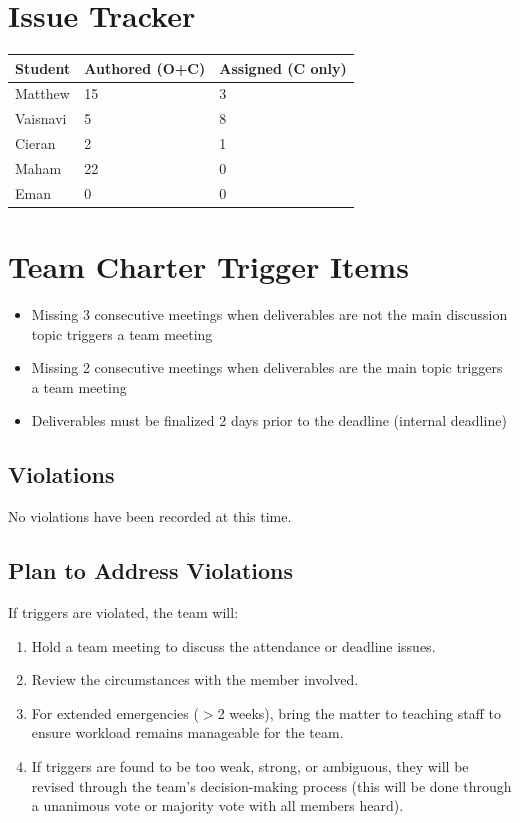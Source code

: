 \documentclass{article}
\begin{document}
\section{Issue Tracker}

\begin{table}[H]
\centering
\begin{tabular}{lll}
\toprule
\textbf{Student} & \textbf{Authored (O+C)} & \textbf{Assigned (C only)}\\
\midrule
Matthew & 15 & 3 \\
Vaisnavi & 5 & 8 \\
Cieran & 2 & 1 \\
Maham & 22 & 0 \\
Eman & 0 & 0 \\
\bottomrule
\end{tabular}
\end{table}


\section{Team Charter Trigger Items}

\begin{itemize}
    \item Missing 3 consecutive meetings when deliverables are not the main discussion topic triggers a team meeting
    \item Missing 2 consecutive meetings when deliverables are the main topic triggers a team meeting
    \item Deliverables must be finalized 2 days prior to the deadline (internal deadline)
\end{itemize}
 
\subsection{Violations}
No violations have been recorded at this time.
 
\subsection{Plan to Address Violations}
If triggers are violated, the team will:

\begin{enumerate}
    \item Hold a team meeting to discuss the attendance or deadline issues.
    \item Review the circumstances with the member involved.
    \item For extended emergencies ($>$2 weeks), bring the matter to teaching staff to ensure workload remains manageable for the team.
    \item If triggers are found to be too weak, strong, or ambiguous, they will be revised through the team's decision-making process (this will be done through a unanimous vote or majority vote with all members heard).
\end{enumerate}
\end{document}
